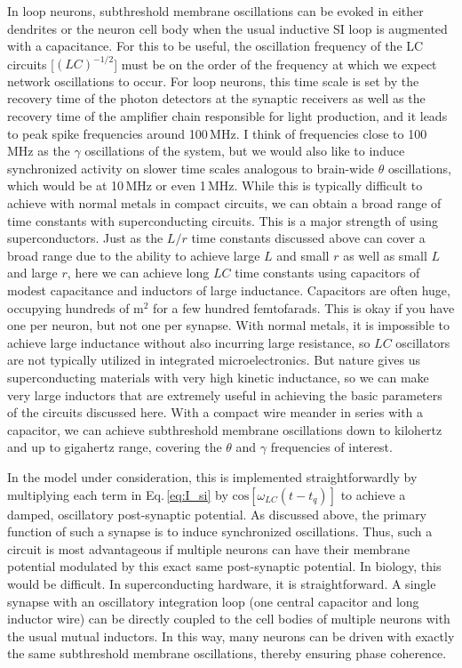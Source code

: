 \documentclass[]{article}
\begin{document}
In loop neurons, subthreshold membrane oscillations can be evoked in either dendrites or the neuron cell body when the usual inductive SI loop is augmented with a capacitance. For this to be useful, the oscillation frequency of the LC circuits [$(LC)^{-1/2}$] must be on the order of the frequency at which we expect network oscillations to occur. For loop neurons, this time scale is set by the recovery time of the photon detectors at the synaptic receivers as well as the recovery time of the amplifier chain responsible for light production, and it leads to peak spike frequencies around 100\,MHz. I think of frequencies close to 100\,MHz as the $\gamma$ oscillations of the system, but we would also like to induce synchronized activity on slower time scales analogous to brain-wide $\theta$ oscillations, which would be at 10\,MHz or even 1\,MHz. While this is typically difficult to achieve with normal metals in compact circuits, we can obtain a broad range of time constants with superconducting circuits. This is a major strength of using superconductors. Just as the $L/r$ time constants discussed above can cover a broad range due to the ability to achieve large $L$ and small $r$ as well as small $L$ and large $r$, here we can achieve long $LC$ time constants using capacitors of modest capacitance and inductors of large inductance. Capacitors are often huge, occupying hundreds of \textmu m$^2$ for a few hundred femtofarads. This is okay if you have one per neuron, but not one per synapse. With normal metals, it is impossible to achieve large inductance without also incurring large resistance, so $LC$ oscillators are not typically utilized in integrated microelectronics. But nature gives us superconducting materials with very high kinetic inductance, so we can make very large inductors that are extremely useful in achieving the basic parameters of the circuits discussed here. With a compact wire meander in series with a capacitor, we can achieve subthreshold membrane oscillations down to kilohertz and up to gigahertz range, covering the $\theta$ and $\gamma$ frequencies of interest.

In the model under consideration, this is implemented straightforwardly by multiplying each term in Eq.\,\ref{eq:I_si} by $\mathrm{cos}[\omega_{LC} (t-t_q)]$ to achieve a damped, oscillatory post-synaptic potential. As discussed above, the primary function of such a synapse is to induce synchronized oscillations. Thus, such a circuit is most advantageous if multiple neurons can have their membrane potential modulated by this exact same post-synaptic potential. In biology, this would be difficult. In superconducting hardware, it is straightforward. A single synapse with an oscillatory integration loop (one central capacitor and long inductor wire) can be directly coupled to the cell bodies of multiple neurons with the usual mutual inductors. In this way, many neurons can be driven with exactly the same subthreshold membrane oscillations, thereby ensuring phase coherence.
\end{document}
